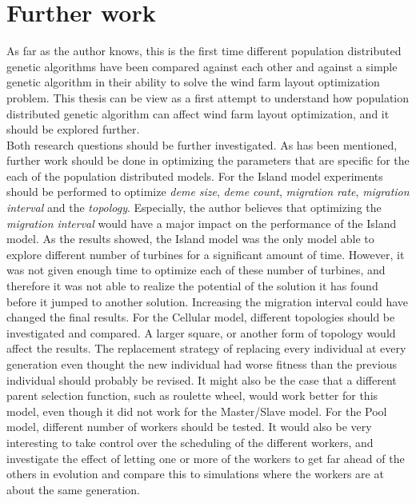 \section{Further work}\label{section:further work}
As far as the author knows, this is the first time different population distributed genetic algorithms have been compared against each other and against a simple genetic algorithm in their ability to solve the wind farm layout optimization problem. This thesis can be view as a first attempt to understand how population distributed genetic algorithm can affect wind farm layout optimization, and it should be explored further.\\


\noindent Both research questions should be further investigated. As has been mentioned, further work should be done in optimizing the parameters that are specific for the each of the population distributed models. For the Island model experiments should be performed to optimize \textit{deme size}, \textit{deme count}, \textit{migration rate}, \textit{migration interval} and the \textit{topology}. Especially, the author believes that optimizing the \textit{migration interval} would have a major impact on the performance of the Island model. As the results showed, the Island model was the only model able to explore different number of turbines for a significant amount of time. However, it was not given enough time to optimize each of these number of turbines, and therefore it was not able to realize the potential of the solution it has found before it jumped to another solution. Increasing the migration interval could have changed the final results. For the Cellular model, different topologies should be investigated and compared. A larger square, or another form of topology would affect the results. The replacement strategy of replacing every individual at every generation even thought the new individual had worse fitness than the previous individual should probably be revised. It might also be the case that a different parent selection function, such as roulette wheel, would work better for this model, even though it did not work for the Master/Slave model. For the Pool model, different number of workers should be tested. It would also be very interesting to take control over the scheduling of the different workers, and investigate the effect of letting one or more of the workers to get far ahead of the others in evolution and compare this to simulations where the workers are at about the same generation. \\


